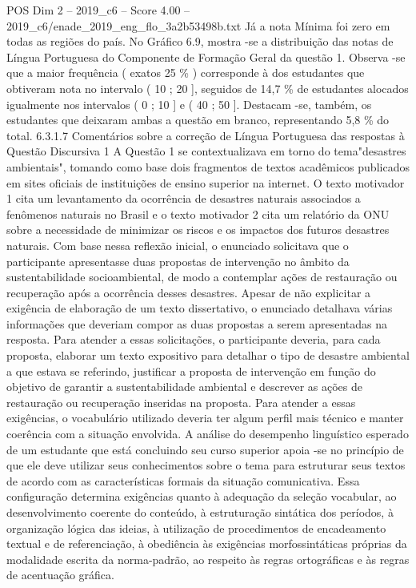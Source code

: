 \begin{textsample}{POS Dim 2 – 2019\_c6 – Score 4.00 – 2019\_c6/enade\_2019\_eng\_flo\_3a2b53498b.txt}
Já a nota Mínima foi zero em todas as regiões do país.
No Gráfico 6.9, mostra -se a distribuição das notas de Língua Portuguesa do Componente de Formação Geral da questão 1.
Observa -se que a maior frequência ( exatos 25 \% ) corresponde à dos estudantes que obtiveram nota no intervalo ( 10 ; 20 ], seguidos de 14,7 \% de estudantes alocados igualmente nos intervalos ( 0 ; 10 ] e ( 40 ; 50 ].
Destacam -se, também, os estudantes que deixaram ambas a questão em branco, representando 5,8 \% do total. 6.3.1.7 Comentários sobre a correção de Língua Portuguesa das respostas à Questão Discursiva 1 A Questão 1 se contextualizava em torno do tema"desastres ambientais", tomando como base dois fragmentos de textos acadêmicos publicados em sites oficiais de instituições de ensino superior na internet.
O texto motivador 1 cita um levantamento da ocorrência de desastres naturais associados a fenômenos naturais no Brasil e o texto motivador 2 cita um relatório da ONU sobre a necessidade de minimizar os riscos e os impactos dos futuros desastres naturais.
Com base nessa reflexão inicial, o enunciado solicitava que o participante apresentasse duas propostas de intervenção no âmbito da sustentabilidade socioambiental, de modo a contemplar ações de restauração ou recuperação após a ocorrência desses desastres.
Apesar de não explicitar a exigência de elaboração de um texto dissertativo, o enunciado detalhava várias informações que deveriam compor as duas propostas a serem apresentadas na resposta.
Para atender a essas solicitações, o participante deveria, para cada proposta, elaborar um texto expositivo para detalhar o tipo de desastre ambiental a que estava se referindo, justificar a proposta de intervenção em função do objetivo de garantir a sustentabilidade ambiental e descrever as ações de restauração ou recuperação inseridas na proposta.
Para atender a essas exigências, o vocabulário utilizado deveria ter algum perfil mais técnico e manter coerência com a situação envolvida.
A análise do desempenho linguístico esperado de um estudante que está concluindo seu curso superior apoia -se no princípio de que ele deve utilizar seus conhecimentos sobre o tema para estruturar seus textos de acordo com as características formais da situação comunicativa.
Essa configuração determina exigências quanto à adequação da seleção vocabular, ao desenvolvimento coerente do conteúdo, à estruturação sintática dos períodos, à organização lógica das ideias, à utilização de procedimentos de encadeamento textual e de referenciação, à obediência às exigências morfossintáticas próprias da modalidade escrita da norma-padrão, ao respeito às regras ortográficas e às regras de acentuação gráfica.

\end{textsample}
